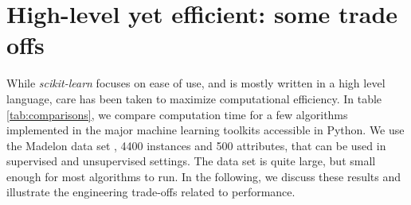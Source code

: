 \documentclass[twoside,11pt]{article}
\begin{document}
\section{High-level yet efficient: some trade offs}


While \emph{scikit-learn} focuses on ease of use, and is
mostly written in a high level language, care has been taken to maximize
computational efficiency. In table \ref{tab:comparisons}, we compare
computation time for a few algorithms implemented in the major machine
learning toolkits accessible in Python. We use the Madelon data
set \citep{Guyon2004}, 4400 instances and 500 attributes,
that can be used in supervised
and unsupervised settings.  The data set is quite large, but small enough for most
algorithms to run.
%
%
%
%
In the following, we discuss these results and illustrate
the engineering trade-offs related to performance.
\end{document}
